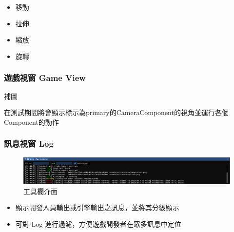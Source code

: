 \begin{itemize}
\item{移動}
\item{拉伸}
\item{縮放}
\item{旋轉}
\end{itemize}

\subsubsection{遊戲視窗 Game View}

補圖

在測試期間將會顯示標示為primary的CameraComponent的視角並運行各個Component的動作

\subsubsection{訊息視窗 Log}

\begin{figure}[h]
    \begin{center}
    \includegraphics[width=\textwidth]{./resources/editor/logger.png}
    \end{center}
\caption{工具欄介面}
\end{figure}

\begin{itemize}
\item{顯示開發人員輸出或引擎輸出之訊息，並將其分級顯示}
\item{可對 Log 進行過濾，方便遊戲開發者在眾多訊息中定位}
\end{itemize}

